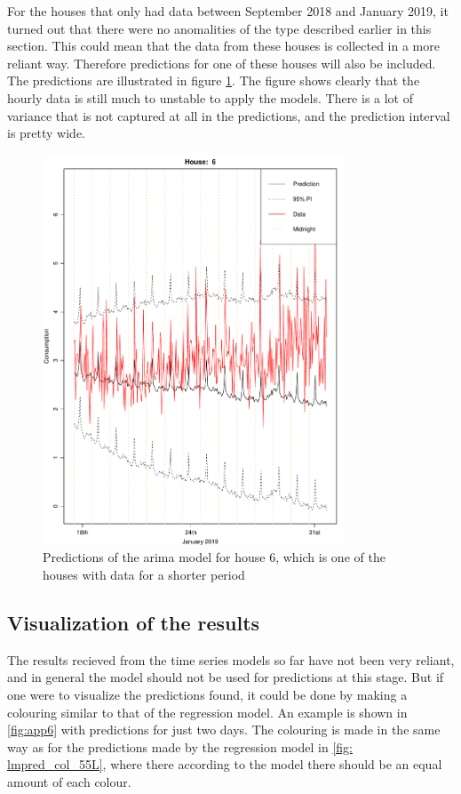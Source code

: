 \noindent For the houses that only had data between September 2018 and January 2019, it turned out that there were no anomalities of the type described earlier in this section. This could mean that the data from these houses is collected in a more reliant way. Therefore predictions for one of these houses will also be included. The predictions are illustrated in figure \cref{fig:arima1_pred_6}. The figure shows clearly that the hourly data is still much to unstable to apply the models. There is a lot of variance that is not captured at all in the predictions, and the prediction interval is pretty wide.


\begin{figure}
    \centering
    \includegraphics[width=0.8\textwidth]{../../../figures/Pred14days6.pdf}
    \caption{Predictions of the arima model for house 6, which is one of the houses with data for a shorter period}
    \label{fig:arima1_pred_6}
\end{figure}



\subsection{Visualization of the results}

\noindent The results recieved from the time series models so far have not been very reliant, and in general the model should not be used for predictions at this stage. But if one were to visualize the predictions found, it could be done by making a colouring similar to that of the regression model. An example is shown in \cref{fig:app6} with predictions for just two days. The colouring is made in the same way as for the predictions made by the regression model in \cref{fig: lmpred_col_55L}, where there according to the model there should be an equal amount of each colour.

